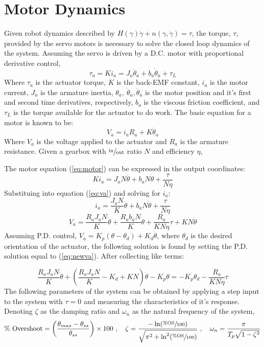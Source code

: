 \documentclass[12pt]{report}
\begin{document}
\section{Motor Dynamics}
Given robot dynamics described by \(H(\gamma)\ddot{\gamma} + n(\gamma,\dot{\gamma}) = \tau\), the torque, $\tau$, provided by the servo motors is necessary to solve the closed loop dynamics of the system. Assuming the servo is driven by a D.C. motor with proportional derivative control,
\begin{equation}
  \tau_a = Ki_a = J_a\ddot{\theta}_a + b_a\dot{\theta}_a + \tau_L
  \label{eq:motor}
\end{equation}
Where $\tau_a$ is the actuator torque, $K$ is the back-EMF constant, $i_a$ is the motor current, $J_a$ is the armature inertia, $\theta_a,~\dot{\theta}_a,\ddot{\theta}_a$ is the motor position and it's first and second time derivatives, respectively, $b_a$ is the viscous friction coefficient, and $\tau_L$ is the torque available for the actuator to do work. The basic equation for a motor is known to be:
\begin{equation}
  V_a = i_aR_a + K\dot{\theta}_a
  \label{eq:va}
\end{equation}
Where $V_a$ is the voltage applied to the actuator and $R_a$ is the armature resistance. Given a gearbox with $\sfrac{\text{in}}{\text{out}}$ ratio $N$ and efficiency $\eta$,

The motor equation (\ref{eq:motor}) can be expressed in the output coordinates:
\[
Ki_a = J_aN\ddot{\theta} + b_aN\dot{\theta} + \frac{\tau}{N\eta}
\]
Substituing into equation (\ref{eq:va}) and solving for $i_a$:
\[
  i_a = \frac{J_aN}{K}\ddot{\theta} + b_aN\dot{\theta} + \frac{\tau}{N\eta}
\]
\begin{equation}
  V_a = \frac{R_aJ_aN}{K}\ddot{\theta} + \frac{R_ab_aN}{K}\dot{\theta} + \frac{R_a}{KN\eta}\tau + KN\dot{\theta}
  \label{eq:newva}
\end{equation}
Assuming P.D. control, \(V_a = K_p(\theta-\theta_d) + K_d\dot{\theta}\), where $\theta_d$ is the desired orientation of the actuator, the following solution is found by setting the P.D. solution equal to (\ref{eq:newva}). After collecting like terms:

\begin{equation}
  \frac{R_aJ_aN}{K}\ddot{\theta} + \left( \frac{R_aJ_aN}{K} - K_d + KN \right)\dot{\theta} - K_p\theta = -K_p\theta_d - \frac{R_a}{KN\eta}\tau
  \label{eq:end1}
\end{equation}
\newpage
The following parameters of the system can be obtained by applying a step input to the system with $\tau=0$ and measuring the characteristics of it's response. Denoting $\zeta$ as the damping ratio and $\omega_n$ as the natural frequency of the system,
\[
  \text{\% Overshoot} = \left( \frac{\theta_{max} - \theta_{ss}}{\theta_{ss}} \right) \times 100~,\quad \zeta = \frac{-\ln(\sfrac{\%\text{OS}}{100})}{\sqrt{\pi^2 + \ln^2(\sfrac{\%\text{OS}}{100})}}~,\quad \omega_n = \frac{\pi}{T_p\sqrt{1-\zeta^2}}
\]
\end{document}

